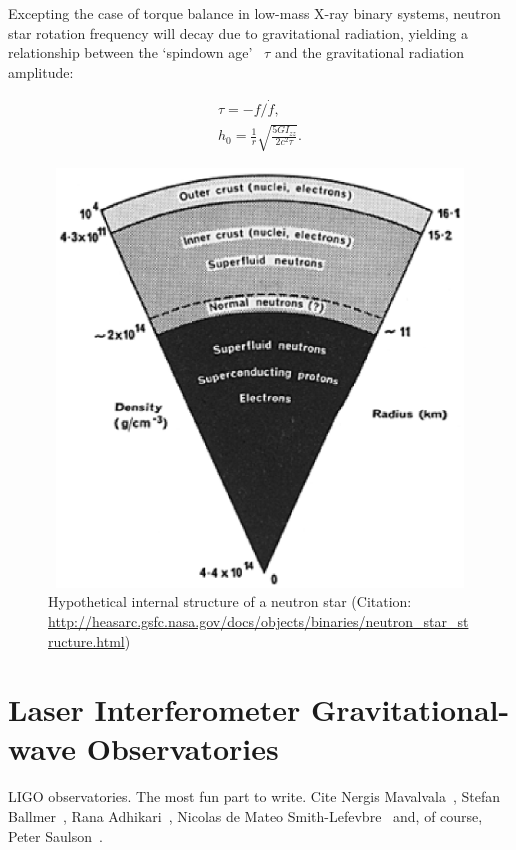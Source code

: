 Excepting the case of torque balance in low-mass X-ray binary systems, neutron star rotation frequency will decay due to gravitational radiation, yielding a relationship between the `spindown age'~\cite{Brady1998} $\tau$ and the gravitational radiation amplitude:

        \begin{eqnarray}
        \tau = -f / \dot{f}, \\
        h_0 = \frac{1}{r} \sqrt{\frac{5 G I_{zz}}{2 c^2 \tau}}.
        \end{eqnarray}

	\begin{figure}
	\begin{center}
	\includegraphics[height=111mm, width=148mm]{neutron_star_structure.eps}
	\caption{Hypothetical internal structure of a neutron star (Citation: \url{http://heasarc.gsfc.nasa.gov/docs/objects/binaries/neutron_star_structure.html})} 
	\label{neutron_star_structure}
	\end{center}
	\end{figure}


    \section{Laser Interferometer Gravitational-wave Observatories}
    \label{LIGO}
        
        LIGO observatories. The most fun part to write. Cite Nergis Mavalvala~\cite{MavalvalaThesis}, Stefan Ballmer~\cite{BallmerThesis}, Rana Adhikari~\cite{AdhikariThesis}, Nicolas de Mateo Smith-Lefevbre~\cite{SmithThesis} and, of course, Peter Saulson~\cite{Saulson}.

